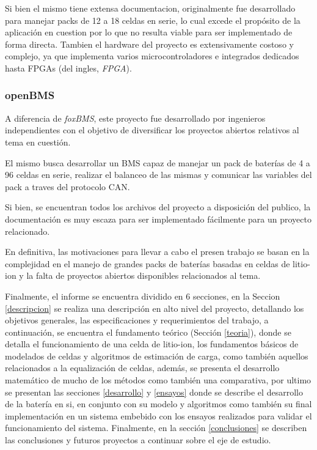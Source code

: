 \documentclass[10pt,a4paper]{article}
\begin{document}
\noindent Si bien el mismo tiene extensa documentacion, originalmente fue
desarrollado para manejar packs de 12 a 18 celdas en serie, lo cual excede el
prop\'osito de la aplicaci\'on en cuestion por lo que no resulta viable para ser
implementado de forma directa. Tambien el hardware del proyecto es
extensivamente costoso y complejo, ya que implementa varios microcontroladores e
integrados dedicados hasta \acrshort{FPGA}s (del ingles, \emph{\acrlong{FPGA}}).

\subsubsection{openBMS}

A diferencia de \emph{foxBMS}, este proyecto fue desarrollado por ingenieros
independientes con el objetivo de diversificar los proyectos abiertos relativos
al tema en cuesti\'on.

\noindent El mismo busca desarrollar un \acrshort{BMS} capaz de manejar un
pack de bater\'ias de 4 a 96 celdas en serie, realizar el balanceo de las mismas 
y comunicar las variables del pack a traves del protocolo \acrshort{CAN}.

\noindent Si bien, se encuentran todos los archivos del proyecto a disposición
del publico, la documentaci\'on es muy escaza para ser implementado
f\'acilmente para un proyecto relacionado.

\noindent En definitiva, las motivaciones para llevar a cabo el presen trabajo
se basan en la complejidad en el manejo de grandes packs de
bater\'ias basadas en celdas de litio-ion y la falta de proyectos abiertos
disponibles relacionados al tema.

\noindent Finalmente, el informe se encuentra dividido en 6 secciones, en
la Seccion \ref{descripcion} se realiza una descripci\'on en alto nivel del
proyecto, detallando los objetivos generales, las especificaciones y
requerimientos del trabajo, a continuaci\'on, se encuentra el fundamento 
te\'orico (Secci\'on \ref{teoria}), donde se detalla el funcionamiento de una 
celda de litio-ion, los fundamentos b\'asicos de modelados de celdas y 
algoritmos de estimaci\'on de carga, como tambi\'en aquellos relacionados a la 
equalizaci\'on de celdas, adem\'as, se presenta el desarrollo matem\'atico de 
mucho de los m\'etodos como tambi\'en una comparativa, por ultimo se presentan 
las secciones \ref{desarrollo} y \ref{ensayos} donde se describe el desarrollo 
de la bater\'ia en si, en conjunto con su modelo y algoritmos como tambi\'en su 
final implementaci\'on en un sistema embebido con los ensayos realizados para 
validar el funcionamiento del sistema. Finalmente, en la secci\'on 
\ref{conclusiones} se describen las conclusiones y futuros proyectos a continuar 
sobre el eje de estudio.
\end{document}
